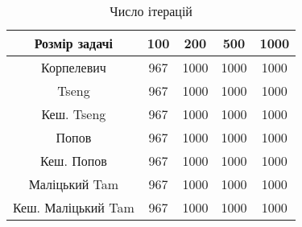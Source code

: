 \begin{table}[H]
	\centering
	\begin{tabular}{|c||c|c|c|c|}\hline
		Розмір задачі & 100 & 200 & 500 & 1000 \\ \hline \hline
		Корпелевич & 967 & 1000 & 1000 & 1000 \\ \hline
		Tseng & 967 & 1000 & 1000 & 1000 \\ \hline
		Кеш. Tseng & 967 & 1000 & 1000 & 1000 \\ \hline
		Попов & 967 & 1000 & 1000 & 1000 \\ \hline
		Кеш. Попов & 967 & 1000 & 1000 & 1000 \\ \hline
		Маліцький Tam & 967 & 1000 & 1000 & 1000 \\ \hline
		Кеш. Маліцький Tam & 967 & 1000 & 1000 & 1000 \\ \hline
	\end{tabular}
	\caption{Число ітерацій}
\end{table}
